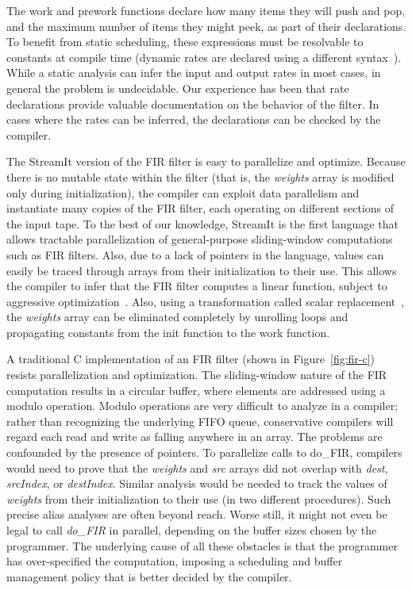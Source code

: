 The work and prework functions declare how many items they will push
and pop, and the maximum number of items they might peek, as part of
their declarations.  To benefit from static scheduling, these
expressions must be resolvable to constants at compile time (dynamic
rates are declared using a different
syntax~\cite{streamit-lang-spec}). While a static analysis can infer
the input and output rates in most cases, in general the problem is
undecidable.  Our experience has been that rate declarations provide
valuable documentation on the behavior of the filter.  In cases where
the rates can be inferred, the declarations can be checked by the
compiler.

The StreamIt version of the FIR filter is easy to parallelize and
optimize.  Because there is no mutable state within the filter (that
is, the {\it weights} array is modified only during initialization),
the compiler can exploit data parallelism and instantiate many copies
of the FIR filter, each operating on different sections of the input
tape.  To the best of our knowledge, StreamIt is the first language
that allows tractable parallelization of general-purpose
sliding-window computations such as FIR filters.  Also, due to a lack
of pointers in the language, values can easily be traced through
arrays from their initialization to their use.  This allows the
compiler to infer that the FIR filter computes a linear function,
subject to aggressive optimization~\cite{lamb-pldi03}.  Also,
using a transformation called scalar
replacement~\cite{sermulins:lctes:2005}, the {\it weights} array can
be eliminated completely by unrolling loops and propagating constants
from the init function to the work function.

A traditional C implementation of an FIR filter (shown in
Figure~\ref{fig:fir-c}) resists parallelization and optimization.  The
sliding-window nature of the FIR computation results in a circular
buffer, where elements are addressed using a modulo operation.  Modulo
operations are very difficult to analyze in a compiler; rather than
recognizing the underlying FIFO queue, conservative compilers will
regard each read and write as falling anywhere in an array.  The
problems are confounded by the presence of pointers.  To parallelize
calls to do\_FIR, compilers would need to prove that the {\it weights}
and {\it src} arrays did not overlap with {\it dest}, {\it srcIndex},
or {\it destIndex}.  Similar analysis would be needed to track the
values of {\it weights} from their initialization to their use (in two
different procedures).  Such precise alias analyses are often beyond
reach.  Worse still, it might not even be legal to call {\it do\_FIR}
in parallel, depending on the buffer sizes chosen by the programmer.
The underlying cause of all these obstacles is that the programmer has
over-specified the computation, imposing a scheduling and buffer
management policy that is better decided by the compiler.

